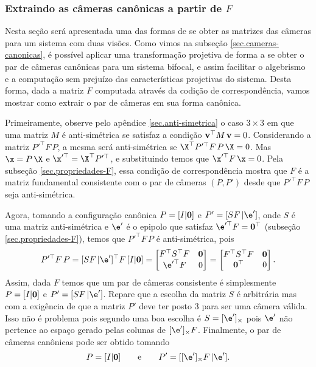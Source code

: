 \subsubsection{Extraindo as câmeras canônicas a partir de $F$}
Nesta seção será apresentada uma das formas de se obter as matrizes das câmeras para um sistema com duas visões. Como vimos na subseção \ref{sec.cameras-canonicas}, é possível aplicar uma transformação projetiva de forma a se obter o par de câmeras canônicas para um sistema bifocal, e assim facilitar o algebrismo e a computação sem prejuízo das características projetivas do sistema. Desta forma, dada a matriz $F$ computada através da codição de correspondência, vamos mostrar como extrair o par de câmeras em sua forma canônica.

Primeiramente, observe pelo apêndice \ref{sec.anti-simetrica} o caso $3\times3$ em que uma matriz $M$ é anti-simétrica se satisfaz a condição ${\bf v}^\top M\,{\bf v}=0$. Considerando a matriz $P'^\top F\,P$, a mesma será anti-simétrica se $\X^\top P'^\top F\,P\,\X=0$. Mas $\x=P\,\X$ e $\x'^\top=\X^\top P'^\top$, e substituindo temos que $\x'^\top F\,\x=0$. Pela subseção \ref{sec.propriedades-F}, essa condição de correspondência mostra que $F$ é a matriz fundamental consistente com o par de câmeras $(P,P')$ desde que $P'^\top F\,P$ seja anti-simétrica.

Agora, tomando a configuração canônica $P=[I|{\bf 0}]$ e $P'=[SF\,|\e']$, onde $S$ é uma matriz anti-simétrica e $\e'$ é o epipolo que satisfaz $\e'^\top F={\bf 0}^\top$ (subseção \ref{sec.propriedades-F}), temos que $P'^\top F\,P$ é anti-simétrica, pois
\begin{equation*}
P'^\top F\,P=[SF\,|\e']^\top F\,[I|{\bf 0}]=
\begin{bmatrix}
F^\top S^\top F&{\bf 0}\\
\e'^\top F&0
\end{bmatrix}=
\begin{bmatrix}
F^\top S^\top F&{\bf 0}\\
{\bf 0}^\top&0
\end{bmatrix}.
\end{equation*}
Assim, dada $F$ temos que um par de câmeras consistente é simplesmente $P=[I|{\bf 0}]$ e $P'=[SF\,|\e']$. Repare que a escolha da matriz $S$ é arbitrária mas com a exigência de que a matriz $P'$ deve ter posto 3 para ser uma câmera válida. Isso não é problema pois segundo \citep{luong} uma boa escolha é $S=[\e']_\times$ pois $\e'$ não pertence ao espaço gerado pelas colunas de $[\e']_\times F$. Finalmente, o par de câmeras canônicas pode ser obtido tomando 
\begin{equation}\label{eq.cameras-dada-F}
P=[I|{\bf 0}]\qquad\text{e}\qquad P'=[[\e']_\times F\,|\e'].
\end{equation}

